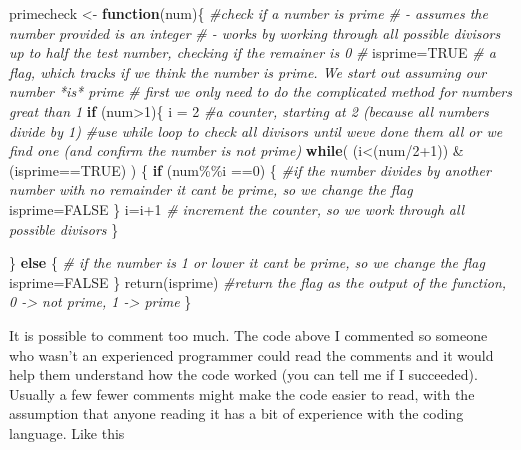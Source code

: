 \documentclass[
  12pt,
  a5paper,
]{book}
\newenvironment{Shaded}{\begin{snugshade}}{\end{snugshade}}
\newcommand{\CommentTok}[1]{\textcolor[rgb]{0.56,0.35,0.01}{\textit{#1}}}
\newcommand{\ConstantTok}[1]{\textcolor[rgb]{0.00,0.00,0.00}{#1}}
\newcommand{\ControlFlowTok}[1]{\textcolor[rgb]{0.13,0.29,0.53}{\textbf{#1}}}
\newcommand{\DecValTok}[1]{\textcolor[rgb]{0.00,0.00,0.81}{#1}}
\newcommand{\FunctionTok}[1]{\textcolor[rgb]{0.00,0.00,0.00}{#1}}
\newcommand{\NormalTok}[1]{#1}
\newcommand{\OtherTok}[1]{\textcolor[rgb]{0.56,0.35,0.01}{#1}}
\newcommand{\SpecialCharTok}[1]{\textcolor[rgb]{0.00,0.00,0.00}{#1}}
\begin{document}
\begin{Shaded}
\begin{Highlighting}[]
\NormalTok{primecheck }\OtherTok{\textless{}{-}} \ControlFlowTok{function}\NormalTok{(num)\{}
  \CommentTok{\#check if a number is prime}
  \CommentTok{\# {-} assumes the number provided is an integer}
  \CommentTok{\# {-} works by working through all possible divisors up to half the test number, checking if the remainer is 0}
  \CommentTok{\#}
\NormalTok{  isprime}\OtherTok{=}\ConstantTok{TRUE} \CommentTok{\# a flag, which tracks if we think the number is prime. We start out assuming our number *is* prime}
  \CommentTok{\# first we only need to do the complicated method for numbers great than 1}
  \ControlFlowTok{if}\NormalTok{ (num}\SpecialCharTok{\textgreater{}}\DecValTok{1}\NormalTok{)\{ }
\NormalTok{    i }\OtherTok{=} \DecValTok{2} \CommentTok{\#a counter, starting at 2 (because all numbers divide by 1)}
      \CommentTok{\#use while loop to check all divisors until we\textquotesingle{}ve done them all or we find one (and confirm the number is not prime)}
\ControlFlowTok{while}\NormalTok{( (i}\SpecialCharTok{\textless{}}\NormalTok{(num}\SpecialCharTok{/}\DecValTok{2}\SpecialCharTok{+}\DecValTok{1}\NormalTok{)) }\SpecialCharTok{\&}\NormalTok{ (isprime}\SpecialCharTok{==}\ConstantTok{TRUE}\NormalTok{) ) \{}
  \ControlFlowTok{if}\NormalTok{ (num}\SpecialCharTok{\%\%}\NormalTok{i }\SpecialCharTok{==}\DecValTok{0}\NormalTok{) \{}
    \CommentTok{\#if the number divides by another number with no remainder it can\textquotesingle{}t be prime, so we change the flag}
\NormalTok{    isprime}\OtherTok{=}\ConstantTok{FALSE}
\NormalTok{  \}}
\NormalTok{  i}\OtherTok{=}\NormalTok{i}\SpecialCharTok{+}\DecValTok{1} \CommentTok{\# increment the counter, so we work through all possible divisors}
\NormalTok{\}}

\NormalTok{\} }\ControlFlowTok{else}\NormalTok{ \{}
  \CommentTok{\# if the number is 1 or lower it can\textquotesingle{}t be prime, so we change the flag}
\NormalTok{  isprime}\OtherTok{=}\ConstantTok{FALSE}
\NormalTok{\}}
\FunctionTok{return}\NormalTok{(isprime) }\CommentTok{\#return the flag as the output of the function, 0 {-}\textgreater{} not prime, 1 {-}\textgreater{} prime}
\NormalTok{\}}
\end{Highlighting}
\end{Shaded}

It is possible to comment too much. The code above I commented so someone who wasn't an experienced programmer could read the comments and it would help them understand how the code worked (you can tell me if I succeeded). Usually a few fewer comments might make the code easier to read, with the assumption that anyone reading it has a bit of experience with the coding language. Like this
\end{document}
